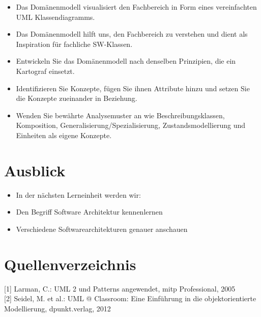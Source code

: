 \documentclass[10pt]{article}
\begin{document}
\begin{itemize}
  \item Das Domänenmodell visualisiert den Fachbereich in Form eines vereinfachten UML Klassendiagramms.
  \item Das Domänenmodell hilft uns, den Fachbereich zu verstehen und dient als Inspiration für fachliche SW-Klassen.
  \item Entwickeln Sie das Domänenmodell nach denselben Prinzipien, die ein Kartograf einsetzt.
  \item Identifizieren Sie Konzepte, fügen Sie ihnen Attribute hinzu und setzen Sie die Konzepte zueinander in Beziehung.
  \item Wenden Sie bewährte Analysemuster an wie Beschreibungsklassen, Komposition, Generalisierung/Spezialisierung, Zustandsmodellierung und Einheiten als eigene Konzepte.
\end{itemize}

\section*{Ausblick}
\begin{itemize}
  \item In der nächsten Lerneinheit werden wir:
  \item Den Begriff Software Architektur kennenlernen
  \item Verschiedene Softwarearchitekturen genauer anschauen
\end{itemize}

\section*{Quellenverzeichnis}
[1] Larman, C.: UML 2 und Patterns angewendet, mitp Professional, 2005\\[0pt]
[2] Seidel, M. et al.: UML @ Classroom: Eine Einführung in die objektorientierte Modellierung, dpunkt.verlag, 2012
\end{document}

